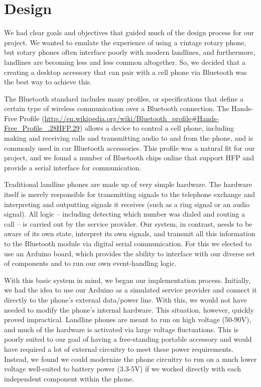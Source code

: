 \documentclass{es50report}
\begin{document}
    \section{Design}
        We had clear goals and objectives that guided much of the design process for our project. We wanted to emulate the experience of using a vintage rotary phone, but rotary phones often interface poorly with modern landlines, and furthermore, landlines are becoming less and less common altogether. So, we decided that a creating a desktop accessory that can pair with a cell phone via Bluetooth was the best way to achieve this.

        The Bluetooth standard includes many profiles, or specifications that define a certain type of wireless communication over a Bluetooth connection. The Hands-Free Profile (\url{http://en.wikipedia.org/wiki/Bluetooth_profile#Hands-Free_Profile_.28HFP.29}) allows a device to control a cell phone, including making and receiving calls and transmitting audio to and from the phone, and is commonly used in car Bluetooth accessories. This profile was a natural fit for our project, and we found a number of Bluetooth chips online that support HFP and provide a serial interface for communication.

        Traditional landline phones are made up of very simple hardware. The hardware itself is merely responsible for transmitting signals to the telephone exchange and interpreting and outputting signals it receives (such as a ring signal or an audio signal). All logic -- including detecting which number was dialed and routing a call -- is carried out by the service provider. Our system, in contrast, needs to be aware of its own state, interpret its own signals, and transmit all this information to the Bluetooth module via digital serial communication. For this we elected to use an Arduino board, which provides the ability to interface with our diverse set of components and to run our own event-handling logic.

        With this basic system in mind, we began our implementation process. Initially, we had the idea to use our Arduino as a simulated service provider and connect it directly to the phone's external data/power line. With this, we would not have needed to modify the phone's internal hardware. This situation, however, quickly proved impractical. Landline phones are meant to run on high voltage (50-90V), and much of the hardware is activated via large voltage fluctuations. This is poorly suited to our goal of having a free-standing portable accessory and would have required a lot of external circuitry to meet these power requirements. Instead, we found we could modernize the phone circuitry to run on a much lower voltage well-suited to battery power (3.3-5V) if we worked directly with each independent component within the phone.
\end{document}
